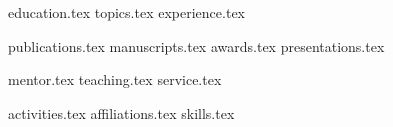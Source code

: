 \documentclass[letterpaper,11pt]{article}
\begin{document}


{education.tex}
{topics.tex}
{experience.tex}


\pagebreak
{publications.tex}
{manuscripts.tex}
{awards.tex}
{presentations.tex}



{mentor.tex}
{teaching.tex}
{service.tex}


{activities.tex}
{affiliations.tex}
{skills.tex}


\pagebreak
\end{document}
